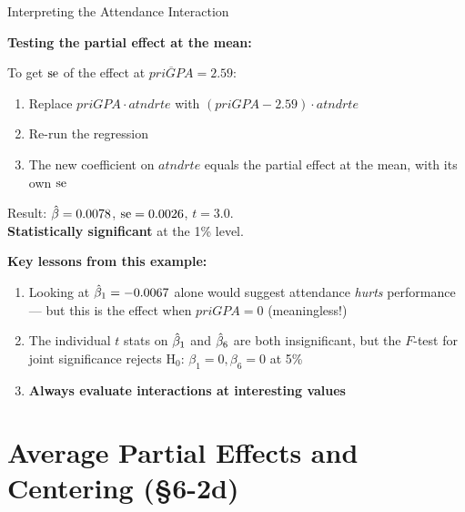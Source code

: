 \documentclass[aspectratio=169, 12pt]{beamer}
\begin{document}
\begin{frame}[shrink=8]{Interpreting the Attendance Interaction}

      \textbf{Testing the partial effect at the mean:}

      \medskip

      To get $\operatorname{se}$ of the effect at $\overline{priGPA} = 2.59$:
      \begin{enumerate}
        \item Replace $priGPA \cdot atndrte$ with $(priGPA - 2.59) \cdot atndrte$
        \item Re-run the regression
        \item The new coefficient on $atndrte$ equals the partial effect at the mean,
              with its own $\operatorname{se}$
      \end{enumerate}

      \medskip

      Result: $\hat{\beta} = 0.0078$, $\operatorname{se} = 0.0026$, $t = 3.0$. \\
      \textbf{Statistically significant} at the 1\% level.
  \medskip

      \begin{highlightbox}
        \textbf{Key lessons from this example:} \\[4pt]
        \begin{enumerate}
          \item Looking at $\hat{\beta}_1 = -0.0067$ alone would
                suggest attendance \emph{hurts} performance ---
                but this is the effect when $priGPA = 0$ (meaningless!)
          \item The individual $t$ stats on $\hat{\beta}_1$ and $\hat{\beta}_6$ are both
                insignificant, but the $F$-test for joint significance
                rejects $\text{H}_0$: $\beta_1 = 0, \beta_6 = 0$ at 5\%
          \item \textbf{Always evaluate interactions at interesting values}
        \end{enumerate}
      \end{highlightbox}

\end{frame}

\section{Average Partial Effects and Centering (\S6-2d)}
\end{document}
